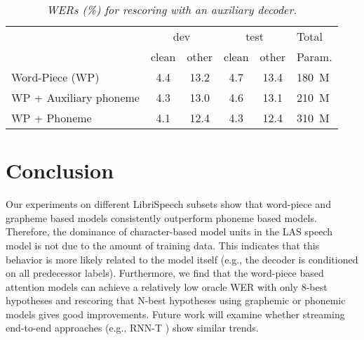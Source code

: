 \begin{table}[h]
	\centering
	\setlength{\tabcolsep}{0.3em}
	\caption{\it WERs (\%) for rescoring with an auxiliary decoder.}
	\vspace{-3mm}
	\label{tab:aux}
	\begin{tabular}{ |l|c|c|c|c|l|} \hline
		\multirow{2}{*}{ }  & \multicolumn{2}{|c|}{dev} & \multicolumn{2}{|c|}{test}  & Total  \\ \cline{2-5}
		& clean & other & clean & other & Param.   \\ \hline
		Word-Piece (WP)           & 4.4 & 13.2 & 4.7 & 13.4  &180~M  \\
		WP + Auxiliary phoneme    &  4.3 & 13.0 &  4.6 &  13.1 &  210~M\\
		WP + Phoneme              &  4.1  & 12.4 &  4.3 &  12.4 & 310~M\\ \hline
		
	\end{tabular}
\end{table}
\vspace{-6mm}
\section{Conclusion}
Our experiments on different LibriSpeech subsets show that word-piece and grapheme based models
consistently outperform phoneme based models.
Therefore, the dominance of character-based model units in the LAS speech model
is not due to the amount of training data. This indicates that this behavior is more likely
related to the model itself (e.g., the decoder is conditioned on all predecessor labels).
Furthermore, we find that the word-piece based attention models can achieve a relatively low
oracle WER with only 8-best hypotheses and rescoring that N-best hypotheses using
graphemic or phonemic models gives good improvements.
Future work will examine whether streaming end-to-end approaches
(e.g., RNN-T \cite{graves2012sequence,RaoSP17}) show similar trends.
\label{sec:foot}
\clearpage

